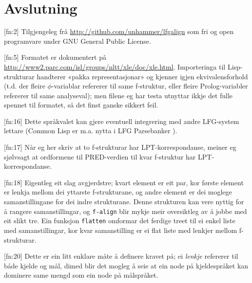 \documentclass[11pt,a4paper,oneside,draft]{book}
\begin{document}
\chapter{Avslutning}
\label{sec-4}







[fn:2] Tilgjengeleg frå \href{http://github.com/unhammer/lfgalign}{http://github.com/unhammer/lfgalign} som fri og
       open programvare under GNU General Public License.

[fn:5] Formatet er dokumentert på
       \href{http://www2.parc.com/isl/groups/nltt/xle/doc/xle.html}{http://www2.parc.com/isl/groups/nltt/xle/doc/xle.html}. Importeringa
       til Lisp-strukturar handterer «pakka representasjonar» og
       kjenner igjen ekvivalensforhold (t.d. der fleire
       $\phi$-variablar refererer til same f-struktur, eller fleire
       Prolog-variabler refererer til same analyseval); men filene eg
       har testa utnyttar ikkje det fulle spennet til formatet, så det
       finst ganske sikkert feil.

[fn:16] Dette språkvalet kan gjere eventuell integrering med andre
        LFG-system lettare (Common Lisp er m.a. nytta i LFG
        Parsebanker \citep{rosen2009lpt}).

[fn:17] Når eg her skriv at to f-strukturar har LPT-korrespondanse,
        meiner eg sjølvsagt at ordformene til PRED-verdien til kvar
        f-struktur har LPT-korrespondanse.

[fn:18] Eigentleg eit slag avgjerdstre; kvart element er eit par, kor
        første element er lenkja mellom dei yttarste f-strukturane, og
        andre element er dei moglege samanstillingane for dei indre
        strukturane. Denne strukturen kan vere nyttig for å rangere
        samanstillingar, og \texttt{f-align} blir mykje meir oversiktleg av å
        jobbe med eit slikt tre. Ein funksjon \texttt{flatten} omformar det
        ferdige treet til ei enkel liste med samanstillingar, kor kvar
        samanstilling er ei flat liste med lenkjer mellom
        f-strukturar.

[fn:20] Dette er ein litt enklare måte å definere kravet på; ei
        \emph{lenkje} refererer til både kjelde og mål, dimed blir det
        mogleg å seie at ein node på kjeldespråket kan dominere same
        mengd som ein node på målspråket.
\end{document}
